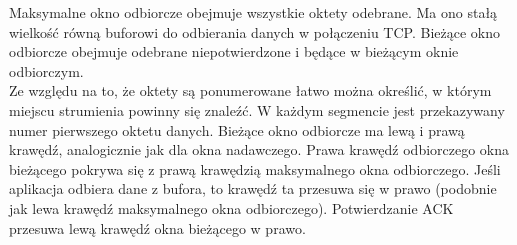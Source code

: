 \documentclass[a4paper]{article}
\begin{document}
Maksymalne okno odbiorcze obejmuje wszystkie oktety odebrane. Ma ono stałą wielkość równą buforowi do
odbierania danych w połączeniu TCP. Bieżące okno odbiorcze obejmuje odebrane niepotwierdzone i będące w bieżącym oknie odbiorczym. \\
Ze względu na to, że oktety są ponumerowane łatwo można
określić, w którym miejscu strumienia powinny się znaleźć. W każdym segmencie jest
przekazywany numer pierwszego oktetu danych.
Bieżące okno odbiorcze ma lewą i prawą krawędź, analogicznie jak dla okna nadawczego. Prawa krawędź odbiorczego okna bieżącego pokrywa się z prawą krawędzią maksymalnego okna odbiorczego. Jeśli aplikacja
odbiera dane z bufora, to krawędź ta przesuwa się w prawo (podobnie jak lewa krawędź
maksymalnego okna odbiorczego). Potwierdzanie ACK przesuwa lewą krawędź okna
bieżącego w prawo.\\
\end{document}
